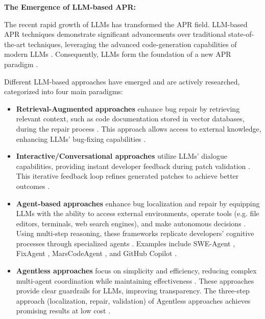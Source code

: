 \textbf{The Emergence of LLM-based APR:}

The recent rapid growth of \acp{LLM} has transformed the APR field. LLM-based APR techniques demonstrate significant advancements over traditional state-of-the-art techniques, leveraging the advanced code-generation capabilities of modern \acp{LLM} \cite{hossainDeepDiveLarge2024}. Consequently, \acp{LLM} form the foundation of a new APR paradigm \cite{chenUnveilingPitfallsUnderstanding2025, anandComprehensiveSurveyAIDriven2024}.

Different LLM-based approaches have emerged and are actively researched, categorized into four main paradigms:

\begin{itemize}
    \item \textbf{Retrieval-Augmented approaches} enhance bug repair by retrieving relevant context, such as code documentation stored in vector databases, during the repair process \cite{puvvadiCodingAgentsComprehensive2025}. This approach allows access to external knowledge, enhancing \acp{LLM}' bug-fixing capabilities \cite{houLargeLanguageModels2024, yinThinkRepairSelfDirectedAutomated2024}.

    \item \textbf{Interactive/Conversational approaches} utilize \acp{LLM}' dialogue capabilities, providing instant developer feedback during patch validation \cite{xiaAutomatedProgramRepair2024, huCanGPTO1Kill2024}. This iterative feedback loop refines generated patches to achieve better outcomes \cite{xiaAutomatedProgramRepair2024}.

    \item \textbf{Agent-based approaches} enhance bug localization and repair by equipping \acp{LLM} with the ability to access external environments, operate tools (e.g. file editors, terminals, web search engines), and make autonomous decisions \cite{anandComprehensiveSurveyAIDriven2024, puvvadiCodingAgentsComprehensive2025, mengEmpiricalStudyLLMbased2024}. Using multi-step reasoning, these frameworks replicate developers' cognitive processes through specialized agents \cite{rondonEvaluatingAgentbasedProgram2025, zhangPATCHEmpoweringLarge2025, leeUnifiedDebuggingApproach2024}. Examples include SWE-Agent \cite{yangSWEagentAgentComputerInterfaces2024}, FixAgent \cite{leeUnifiedDebuggingApproach2024}, MarsCodeAgent \cite{liuMarsCodeAgentAInative2024}, and GitHub Copilot \cite{dohmkeGitHubCopilotMeet2025}.

    \item \textbf{Agentless approaches} focus on simplicity and efficiency, reducing complex multi-agent coordination while maintaining effectiveness \cite{xiaAgentlessDemystifyingLLMbased2024, puvvadiCodingAgentsComprehensive2025}. These approaches provide clear guardrails for \acp{LLM}, improving transparency. The three-step approach (localization, repair, validation) of Agentless approaches achieves promising results at low cost \cite{xiaAgentlessDemystifyingLLMbased2024, mengEmpiricalStudyLLMbased2024}.
\end{itemize}

